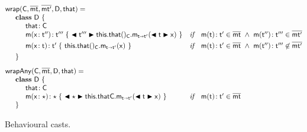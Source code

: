 \documentclass[acmlarge, anonymous, authordraft]{acmart}
\begin{document}
\begin{figure}[!ht]
\[\begin{array}{@{}ll@{}l@{}r@{~}c@{~}r}
\wrap{\C}{\bmt}{\bmtp}{\D}{\that} = \\
\SP \class ~\D ~ \{\\
\SPP \Fdef\that\C \\
\SPP \Mdef\m\x\tpp\tppp {~\bscast\tppp{{\KCall{\this.\that()_{\C}} \m {\bscast{\t}\x}\t\tp }}~}
&     \textit{if}\,\,\,\,\,\, \Mtype\m\t\tp\in\bmt ~\wedge~ \Mtype\m\tpp\tppp\in\bmtp \\
\\[-3mm]
\SPP \Mdef\m\x{\t}{\tp}{~\KCall{\this.\that()_{\C}}\m{\x}\t\tp~}
&    \textit{if}\,\,\,\,\,\, \Mtype\m\t\tp\in\bmt ~\wedge~ \Mtype\m\tpp\tppp\not\in \bmtp \\
\\[-3mm]
\SP \}
\\[3mm]
\wrapAny\C\bmt\D\that = \\
\SP \class~\D~\{\\
\SPP \Fdef \that \C\\ 
\SPP   \Mdef\m\x\any\any {~\bscast\any{\KCall{\FRead\that\C}\m{\bscast{\t}\x}\t\tp }~}
& \textit{if}\,\,\,\,\,\,  \Mtype\m\t\tp\in\b\mt \\
\SP \}\\

\end{array}\]

  \begin{mathpar}
  

\end{mathpar}


\hrulefill
\vspace{-2mm}
\caption{Behavioural casts.}\label{behavetext}
\end{figure}
\end{document}
